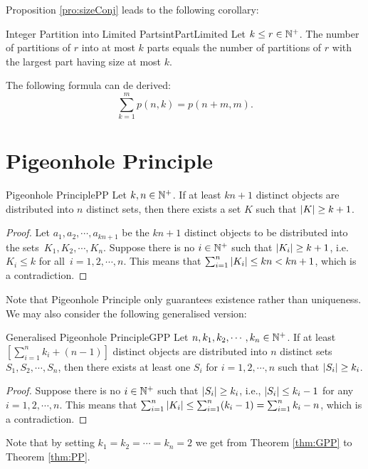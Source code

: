 \documentclass[math]{amznotes}
\theoremstyle{remark}
\begin{document}
Proposition \ref{pro:sizeConj} leads to the following corollary:
\begin{corbox}{Integer Partition into Limited Parts}{intPartLimited}
    Let $k \leq r \in \mathbb{N}^+$. The number of partitions of $r$ into at most $k$ parts equals the number of partitions of $r$ with the largest part having size at most $k$.
\end{corbox}
The following formula can de derived:
\begin{equation*}
    \sum_{k = 1}^{m}p(n, k) = p(n + m, m).
\end{equation*}
\section{Pigeonhole Principle}
\begin{thmbox}{Pigeonhole Principle}{PP}
    Let $k, n \in \mathbb{N}^+$. If at least $kn + 1$ distinct objects are distributed into $n$ distinct sets, then there exists a set $K$ such that ${\left\lvert {K} \right\rvert} \geq k + 1$.
    \tcblower   
    \begin{proof}
        Let $a_1, a_2, \cdots, a_{kn + 1}$ be the $kn + 1$ distinct objects to be distributed into the sets~$K_1, K_2, \cdots, K_n$. Suppose there is no $i \in \mathbb{N}^+$ such that ${\left\lvert {K_i} \right\rvert} \geq k + 1$, i.e. $K_i \leq k$ for all~$i = 1, 2, \cdots, n$. This means that $\sum_{i = 1}^{n}{\left\lvert {K_i} \right\rvert} \leq kn < kn + 1$, which is a contradiction.
    \end{proof}
\end{thmbox}
Note that Pigeonhole Principle only guarantees existence rather than uniqueness. We may also consider the following generalised version:
\begin{thmbox}{Generalised Pigeonhole Principle}{GPP}
    Let $n, k_1, k_2, \cdots, k_n \in \mathbb{N}^+$. If at least $\left[\sum_{i = 1}^{n}k_i + (n - 1)\right]$ distinct objects are distributed into $n$ distinct sets $S_1, S_2, \cdots, S_n$, then there exists at least one $S_i$ for $i = 1, 2, \cdots, n$ such that ${\left\lvert {S_i} \right\rvert} \geq k_i$.
    \tcblower   
    \begin{proof}
        Suppose there is no $i \in \mathbb{N}^+$ such that ${\left\lvert {S_i} \right\rvert} \geq k_i$, i.e., ${\left\lvert {S_i} \right\rvert} \leq k_i - 1$ for any~$i = 1, 2, \cdots, n$. This means that $\sum_{i = 1}^{n}{\left\lvert {K_i} \right\rvert} \leq \sum_{i = 1}^{n}(k_i - 1) = \sum_{i = 1}^{n}k_i - n$, which is a contradiction.
    \end{proof}
\end{thmbox}
Note that by setting $k_1 = k_2 = \cdots = k_n = 2$ we get from Theorem \ref{thm:GPP} to Theorem \ref{thm:PP}.
\end{document}

